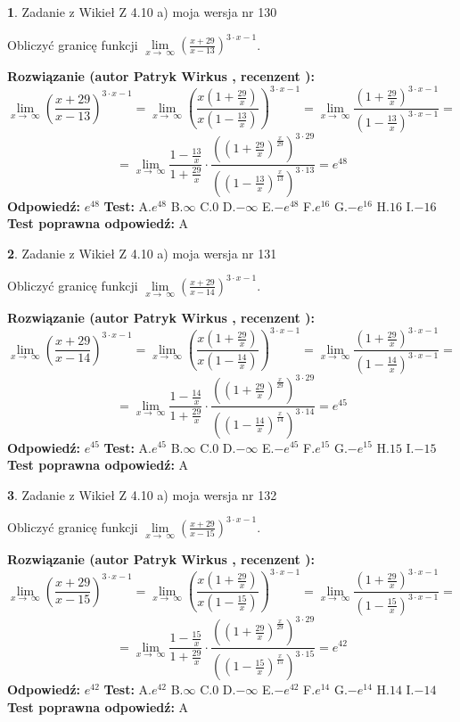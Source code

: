 \documentclass[12pt, a4paper]{article}
\theoremstyle{definition} %
\newtheorem{zad}{}
\newcommand{\zadStart}[1]{\begin{zad}#1\newline}
\newcommand{\zadStop}{\end{zad}}
\newcommand{\rozwStart}[2]{\noindent \textbf{Rozwiązanie (autor #1 , recenzent #2): }\newline}
\newcommand{\rozwStop}{\newline}
\newcommand{\odpStart}{\noindent \textbf{Odpowiedź:}\newline}
\newcommand{\odpStop}{\newline}
\newcommand{\testStart}{\noindent \textbf{Test:}\newline}
\newcommand{\testStop}{\newline}
\newcommand{\kluczStart}{\noindent \textbf{Test poprawna odpowiedź:}\newline}
\newcommand{\kluczStop}{\newline}
\begin{document}
\zadStart{Zadanie z Wikieł Z 4.10 a) moja wersja nr 130}

Obliczyć granicę funkcji  $\lim\limits_{x\to\ \infty}(\frac{x+29}{x-13})^{3\cdot x-1}$.
\zadStop
\rozwStart{Patryk Wirkus}{}
$$\lim\limits_{x\to\ \infty}(\frac{x+29}{x-13})^{3\cdot x-1} = \lim\limits_{x\to\ \infty}(\frac{x(1+\frac{29}{x})}{x(1-\frac{13}{x})})^{3\cdot x-1}=\lim\limits_{x\to\ \infty}\frac{(1+\frac{29}{x})^{3\cdot x-1}}{(1-\frac{13}{x})^{3\cdot x-1}}=$$
$$=\lim\limits_{x\to\ \infty}\frac{1-\frac{13}{x}}{1+\frac{29}{x}}\cdot\frac{((1+\frac{29}{x})^{\frac{x}{29}})^{3\cdot29}}{((1-\frac{13}{x})^{\frac{x}{13}})^{3\cdot13}}=e^{48}$$
\rozwStop
\odpStart
$e^{48}$
\odpStop
\testStart
A.$e^{48}$ B.$\infty$ C.$0$ D.$-\infty$ E.$-e^{48}$
F.$e^{16}$ G.$-e^{16}$
H.$16$
I.$-16$
\testStop
\kluczStart
A
\kluczStop



\zadStart{Zadanie z Wikieł Z 4.10 a) moja wersja nr 131}

Obliczyć granicę funkcji  $\lim\limits_{x\to\ \infty}(\frac{x+29}{x-14})^{3\cdot x-1}$.
\zadStop
\rozwStart{Patryk Wirkus}{}
$$\lim\limits_{x\to\ \infty}(\frac{x+29}{x-14})^{3\cdot x-1} = \lim\limits_{x\to\ \infty}(\frac{x(1+\frac{29}{x})}{x(1-\frac{14}{x})})^{3\cdot x-1}=\lim\limits_{x\to\ \infty}\frac{(1+\frac{29}{x})^{3\cdot x-1}}{(1-\frac{14}{x})^{3\cdot x-1}}=$$
$$=\lim\limits_{x\to\ \infty}\frac{1-\frac{14}{x}}{1+\frac{29}{x}}\cdot\frac{((1+\frac{29}{x})^{\frac{x}{29}})^{3\cdot29}}{((1-\frac{14}{x})^{\frac{x}{14}})^{3\cdot14}}=e^{45}$$
\rozwStop
\odpStart
$e^{45}$
\odpStop
\testStart
A.$e^{45}$ B.$\infty$ C.$0$ D.$-\infty$ E.$-e^{45}$
F.$e^{15}$ G.$-e^{15}$
H.$15$
I.$-15$
\testStop
\kluczStart
A
\kluczStop



\zadStart{Zadanie z Wikieł Z 4.10 a) moja wersja nr 132}

Obliczyć granicę funkcji  $\lim\limits_{x\to\ \infty}(\frac{x+29}{x-15})^{3\cdot x-1}$.
\zadStop
\rozwStart{Patryk Wirkus}{}
$$\lim\limits_{x\to\ \infty}(\frac{x+29}{x-15})^{3\cdot x-1} = \lim\limits_{x\to\ \infty}(\frac{x(1+\frac{29}{x})}{x(1-\frac{15}{x})})^{3\cdot x-1}=\lim\limits_{x\to\ \infty}\frac{(1+\frac{29}{x})^{3\cdot x-1}}{(1-\frac{15}{x})^{3\cdot x-1}}=$$
$$=\lim\limits_{x\to\ \infty}\frac{1-\frac{15}{x}}{1+\frac{29}{x}}\cdot\frac{((1+\frac{29}{x})^{\frac{x}{29}})^{3\cdot29}}{((1-\frac{15}{x})^{\frac{x}{15}})^{3\cdot15}}=e^{42}$$
\rozwStop
\odpStart
$e^{42}$
\odpStop
\testStart
A.$e^{42}$ B.$\infty$ C.$0$ D.$-\infty$ E.$-e^{42}$
F.$e^{14}$ G.$-e^{14}$
H.$14$
I.$-14$
\testStop
\kluczStart
A
\kluczStop
\end{document}
